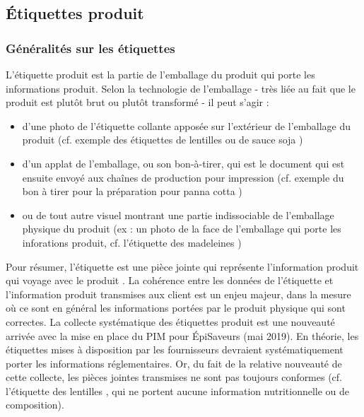             \subsection{\'{E}tiquettes produit}
            \label{etiquettes_produit}

            \subsubsection{Généralités sur les étiquettes}
            L'étiquette produit est la partie de l'emballage du produit qui porte les informations produit.
            Selon la technologie de l'emballage - très liée au fait que le produit est plutôt brut ou plutôt transformé - il peut s'agir :
            \begin{itemize}
                \item d'une photo de l'étiquette collante apposée sur l'extérieur de l'emballage du produit (cf. exemple des étiquettes de lentilles  ou de sauce soja )
                \item d'un applat de l'emballage, ou son bon-à-tirer, qui est le document qui est ensuite envoyé aux chaînes de production pour impression (cf. exemple du bon à tirer pour la préparation pour panna cotta )
                \item ou de tout autre visuel montrant une partie indissociable de l'emballage physique du produit (ex : un photo de la face de l'emballage qui porte les inforations produit, cf. l'étiquette des madeleines )
            \end{itemize}
            Pour résumer, l'étiquette est une pièce jointe qui représente l'information produit qui \og voyage avec le produit \fg.
            La cohérence entre les données de l'étiquette et l'information produit transmises aux client est un enjeu majeur, dans la mesure où ce sont en général les informations portées par le produit physique qui sont correctes.
            La collecte systématique des étiquettes produit est une nouveauté arrivée avec la mise en place du PIM pour \'{E}piSaveurs (mai 2019).
            En théorie, les étiquettes mises à disposition par les fournisseurs devraient systématiquement porter les informations réglementaires.
            Or, du fait de la relative nouveauté de cette collecte, les pièces jointes transmises ne sont pas toujours conformes (cf. l'étiquette des lentilles , qui ne portent aucune information nutritionnelle ou de composition).

